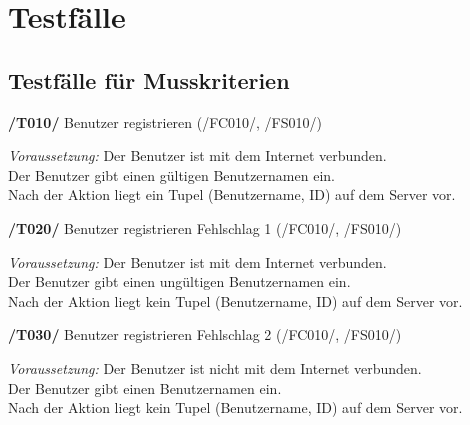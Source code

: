 \section{Testfälle}
\subsection{Testfälle für Musskriterien}

\textbf{/T010/} Benutzer registrieren (/FC010/, /FS010/) \\
\begin{center}
\vspace{-\parskip}
\begin{minipage}[t]{0.9\textwidth}
\emph{Voraussetzung:} Der Benutzer ist mit dem Internet verbunden.\\
Der Benutzer gibt einen gültigen Benutzernamen ein.\\
Nach der Aktion liegt ein Tupel (Benutzername, ID) auf dem Server vor.\\
\end{minipage}
\end{center}

\textbf{/T020/} Benutzer registrieren Fehlschlag 1 (/FC010/, /FS010/) \\
\begin{center}
\vspace{-\parskip}
\begin{minipage}[t]{0.9\textwidth}
\emph{Voraussetzung:} Der Benutzer ist mit dem Internet verbunden.            \\
Der Benutzer gibt einen ungültigen Benutzernamen ein.                   \\
Nach der Aktion liegt kein Tupel (Benutzername, ID) auf dem Server vor.  \\
\end{minipage}
\end{center}

\textbf{/T030/} Benutzer registrieren Fehlschlag 2 (/FC010/, /FS010/) \\
\begin{center}
\vspace{-\parskip}
\begin{minipage}[t]{0.9\textwidth}
\emph{Voraussetzung:} Der Benutzer ist nicht mit dem Internet verbunden.         \\
Der Benutzer gibt einen Benutzernamen ein.                                 \\
Nach der Aktion liegt kein Tupel (Benutzername, ID) auf dem Server vor.     \\
\end{minipage}
\end{center}

